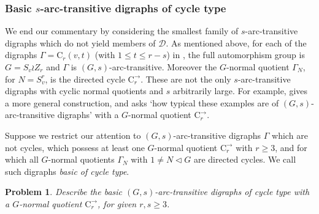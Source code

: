 \documentclass[11pt]{amsart}
\newtheorem{problem}{Problem}
\newcommand{\C}{{\mathrm{C}}}
\newcommand\DD{{\mathscr{D}}}
\begin{document}
\subsubsection{Basic $s$-arc-transitive digraphs of cycle type}
We end our commentary by considering the smallest family of $s$-arc-transitive digraphs which do not yield members of $\DD$. 
As mentioned above, for each of the digraphs $\Gamma=\C_r(v,t)$ (with $1\le t\le r-s$) in \cite[Definition 2.6 and Theorem 2.8]{Praeger}, the full automorphism group is $G=S_v\wr Z_r$ and $\Gamma$ is  $(G,s)$-arc-transitive. Moreover the $G$-normal quotient $\Gamma_N$, for $N=S_v^r$, is the directed cycle $\C_r^\to$. These are not the only $s$-arc-transitive digraphs with cyclic normal quotients and $s$ arbitrarily large. For example, \cite[Definition 2.10]{Praeger} gives a more general construction, and \cite[Remark 2.12]{Praeger} asks `how typical these examples are of $(G,s)$-arc-transitive digraphs' with a $G$-normal quotient $\C_r^\to$. 

Suppose we restrict our attention to $(G,s)$-arc-transitive digraphs $\Gamma$ which are not cycles, which possess at least one $G$-normal quotient $\C_r^\to$ with $r\ge3$, and for which all $G$-normal quotients  $\Gamma_N$ with $1\ne N\lhd G$ are directed cycles. We call such digraphs \emph{basic of cycle type}.  

\begin{problem}\label{p3}
    Describe the 
    basic $(G,s)$-arc-transitive digraphs of cycle type with a $G$-normal quotient $\C_r^\to$, for given $r, s\ge3$. 
\end{problem}




\end{document}
